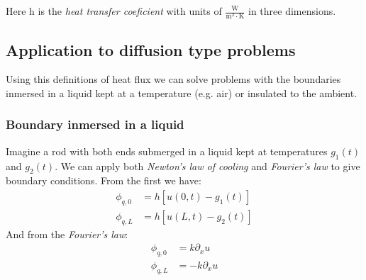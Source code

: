 \documentclass[../pde.tex]{subfiles}
\begin{document}
    Here $\mathrm{h} $ is the \emph{heat transfer coeficient} with units of $\mathrm{\frac{W}{m^2 \cdot K}} $ in three dimensions.
    
    \subsection{\sffamily Application to diffusion type problems}
    Using this definitions of heat flux we can solve problems with the boundaries inmersed in a liquid kept at a temperature (e.g.
    air) or insulated to the ambient.
    
    \subsubsection{\sffamily Boundary inmersed in a liquid}
    Imagine a rod with both ends submerged in a liquid kept at temperatures $g_1(t)$ and $g_2(t)$. We can apply both
    \emph{Newton's law of cooling} and \emph{Fourier's law} to give boundary conditions. From the first we have:
    \begin{align*}
        \phi_{q,0}&=h[u(0,t)-g_1(t)]\\
        \phi_{q,L}&=h[u(L,t)-g_2(t)]
    \end{align*}
    And from the \emph{Fourier's law}:
    \begin{align*}
        \phi _{q,0}&= k \partial_{x} u\\
        \phi_{q,L} &= -k \partial_{x} u
    \end{align*}
    
    
\end{document}
